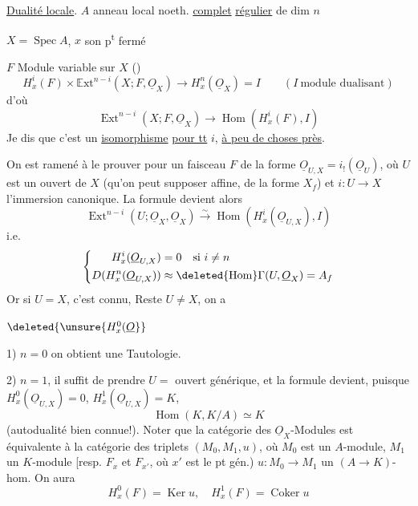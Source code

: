 \uline{Dualité locale}. \quad $A$ anneau local noeth. \uline{complet} \uline{régulier} de dim $n$

$X=\operatorname{Spec} A$, $x$ son p\textsuperscript{t} fermé

$F$ Module variable sur $X$ ()
\[
 H_x^i(F)\times\mathbb E\mathrm{xt}^{n-i}(X;F,\underline O_X)\longrightarrow H_x^n(\underline O_X)=I
 \qquad(I\ \text{module dualisant})
\]
d'où
\[
 \boxed{\operatorname{Ext}^{n-i}(X;F,\underline O_X)\longrightarrow\operatorname{Hom}(H_x^i(F),I)}
\]
Je dis que c'est un \uline{isomorphisme} \uline{pour tt} $i$, \uline{à peu de choses près}.

On est ramené à le prouver pour un faisceau $F$ de la forme $\underline O_{U,X}=i_!(\underline O_U)$, où $U$ est un ouvert de $X$ (qu'on peut supposer affine, de la forme $X_f$) et $i:U\longrightarrow X$ l'immersion canonique. La formule devient alors
\[
 \operatorname{Ext}^{n-i}(U;\underline O_{X},\underline O_X)\xrightarrow{\sim}\operatorname{Hom}(H_x^i(\underline O_{U,X}),I)
\]
i.e.
\[
 \left\{\begin{aligned}
 H_x^i(\underline O_{U,X})&=0\quad\text{si }i\ne n\\
 D(H_x^n(\underline O_{U,X}))&\approx\deleted{\operatorname{Hom}}\Gamma(U,\underline O_X)=A_f
 \end{aligned}\right.
\]
 Or  si $U=X$, c'est connu, Reste $U\ne X$, on a

$\deleted{\unsure{H^0_x(\underline O}}$

1) $n=0$ on obtient une Tautologie.

2) $n=1$, il suffit de prendre $U=$ ouvert générique, et la formule devient, puisque $H^0_x(\underline O_{U,X})=0$, $H^1_x(\underline O_{U,X})=K$,
\[
 \operatorname{Hom}(K,K/A)\simeq K
\]
(autodualité bien connue!). Noter que  la catégorie des $\underline O_X$-Modules est équivalente à la catégorie des triplets $(M_0,M_1,u)$, où $M_0$ est un $A$-module, $M_1$ un $K$-module [resp. $F_x$ et $F_{x'}$, où $x'$ est le pt gén.)  $u:M_0\longrightarrow M_1$ un $(A\longrightarrow K)$-hom. On aura
\[
 H_x^0(F)=\operatorname{Ker}u,\quad H_x^1(F)=\operatorname{Coker}u
\]

